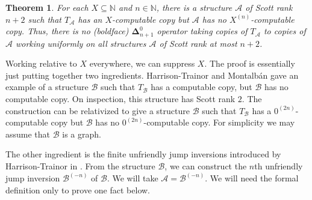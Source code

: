 \documentclass{article}
\newcommand{\Inv}[2]{{#2}^{(-#1)}}
\newcommand{\bfDelta}{\boldsymbol{\Delta}}
\newtheorem{thm}{Theorem}[section]
\theoremstyle{definition}
\begin{document}
	\begin{thm}
		For each $X \subseteq \mathbb{N}$ and $n \in \mathbb{N}$, there is a structure $\mathcal{A}$ of Scott rank $n+2$ such that $T_\mathcal{A}$ has an $X$-computable copy but $\mathcal{A}$ has no $X^{(n)}$-computable copy. Thus, there is no (boldface) $\bfDelta^0_{n+1}$ operator taking copies of $T_\mathcal{A}$ to copies of $\mathcal{A}$ working uniformly on all structures $\mathcal{A}$ of Scott rank at most $n+2$. 
	\end{thm}
	
	Working relative to $X$ everywhere, we can suppress $X$. The proof is essentially just putting together two ingredients. Harrison-Trainor and Montalb\'{a}n \cite{HTMontalban} gave an example of a structure $\mathcal{B}$ such that $T_\mathcal{B}$ has a computable copy, but $\mathcal{B}$ has no computable copy. On inspection, this structure has Scott rank $2$. The construction can be relativized to give a structure $\mathcal{B}$ such that $T_\mathcal{B}$ has a $0^{(2n)}$-computable copy but $\mathcal{B}$ has no $0^{(2n)}$-computable copy. For simplicity we may assume that $\mathcal{B}$ is a graph.
	
	The other ingredient is the finite unfriendly jump inversions introduced by Harrison-Trainor in \cite{unfriendly}. From the structure $\mathcal{B}$, we can construct the $n$th unfriendly jump inversion $\Inv{n}{\mathcal{B}}$ of $\mathcal{B}$. We will take $\mathcal{A} = \Inv{n}{\mathcal{B}}$. We will need the formal definition only to prove one fact below.
	
\end{document}
